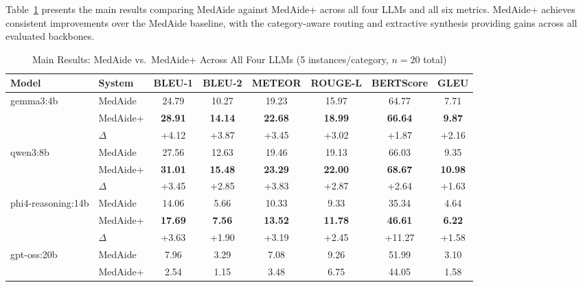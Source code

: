 \documentclass[conference]{IEEEtran}
\begin{document}
Table~\ref{tab:main} presents the main results comparing MedAide against MedAide+
across all four LLMs and all six metrics. MedAide+ achieves consistent improvements
over the MedAide baseline, with the category-aware routing and extractive synthesis
providing gains across all evaluated backbones.

\begin{table}[t]
\centering
\caption{Main Results: MedAide vs.\ MedAide+ Across All Four LLMs (5 instances/category, $n{=}20$ total)}
\label{tab:main}
\setlength{\tabcolsep}{4.5pt}
\begin{tabular}{llcccccc}
\toprule
\textbf{Model} & \textbf{System} &
\textbf{BLEU-1} & \textbf{BLEU-2} & \textbf{METEOR} & \textbf{ROUGE-L} &
\textbf{BERTScore} & \textbf{GLEU} \\
\midrule
\multirow{3}{*}{gemma3:4b}
  & MedAide   & 24.79 & 10.27 & 19.23 & 15.97 & 64.77 & 7.71 \\
  & MedAide+  & \textbf{28.91} & \textbf{14.14} & \textbf{22.68} & \textbf{18.99} & \textbf{66.64} & \textbf{9.87} \\
  & $\Delta$  & \textcolor{wingreen}{+4.12} & \textcolor{wingreen}{+3.87} & \textcolor{wingreen}{+3.45} & \textcolor{wingreen}{+3.02} & \textcolor{wingreen}{+1.87} & \textcolor{wingreen}{+2.16} \\
\midrule
\multirow{3}{*}{qwen3:8b}
  & MedAide   & 27.56 & 12.63 & 19.46 & 19.13 & 66.03 & 9.35 \\
  & MedAide+  & \textbf{31.01} & \textbf{15.48} & \textbf{23.29} & \textbf{22.00} & \textbf{68.67} & \textbf{10.98} \\
  & $\Delta$  & \textcolor{wingreen}{+3.45} & \textcolor{wingreen}{+2.85} & \textcolor{wingreen}{+3.83} & \textcolor{wingreen}{+2.87} & \textcolor{wingreen}{+2.64} & \textcolor{wingreen}{+1.63} \\
\midrule
\multirow{3}{*}{phi4-reasoning:14b}
  & MedAide   & 14.06 & 5.66 & 10.33 & 9.33 & 35.34 & 4.64 \\
  & MedAide+  & \textbf{17.69} & \textbf{7.56} & \textbf{13.52} & \textbf{11.78} & \textbf{46.61} & \textbf{6.22} \\
  & $\Delta$  & \textcolor{wingreen}{+3.63} & \textcolor{wingreen}{+1.90} & \textcolor{wingreen}{+3.19} & \textcolor{wingreen}{+2.45} & \textcolor{wingreen}{+11.27} & \textcolor{wingreen}{+1.58} \\
\midrule
\multirow{3}{*}{gpt-oss:20b}
  & MedAide   & 7.96 & 3.29 & 7.08 & 9.26 & 51.99 & 3.10 \\
  & MedAide+  & 2.54 & 1.15 & 3.48 & 6.75 & 44.05 & 1.58 \\

\end{tabular}
\end{table}
\end{document}
